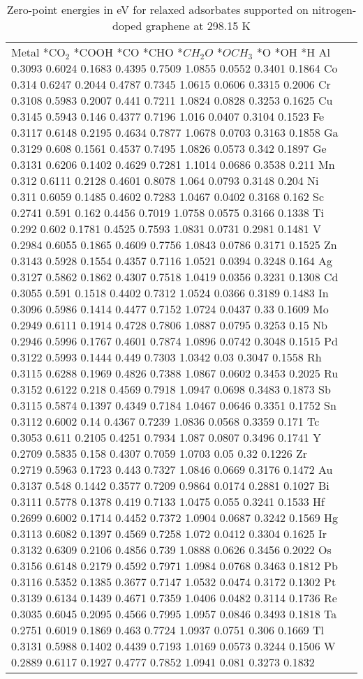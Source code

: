 \begin{table}[h]
    \centering
    \begin{tabular}{lr}
      \hline
      Metal	*CO$_2$	*COOH	*CO	*CHO	*$CH_2O$	*$OCH_3$	*O	*OH	*H
      \hline
      Al	0.3093	0.6024	0.1683	0.4395	0.7509	1.0855	0.0552	0.3401	0.1864
      Co	0.314	  0.6247	0.2044	0.4787	0.7345	1.0615	0.0606	0.3315	0.2006
      Cr	0.3108	0.5983	0.2007	0.441 	0.7211	1.0824	0.0828	0.3253	0.1625
      Cu	0.3145	0.5943	0.146	  0.4377	0.7196	1.016	  0.0407	0.3104	0.1523
      Fe	0.3117	0.6148	0.2195	0.4634	0.7877	1.0678	0.0703	0.3163	0.1858
      Ga	0.3129	0.608	  0.1561	0.4537	0.7495	1.0826	0.0573	0.342	  0.1897
      Ge	0.3131	0.6206	0.1402	0.4629	0.7281	1.1014	0.0686	0.3538	0.211
      Mn	0.312	  0.6111	0.2128	0.4601	0.8078	1.064 	0.0793	0.3148	0.204
      Ni	0.311	  0.6059	0.1485	0.4602	0.7283	1.0467	0.0402	0.3168	0.162
      Sc	0.2741	0.591 	0.162 	0.4456	0.7019	1.0758	0.0575	0.3166	0.1338
      Ti	0.292 	0.602 	0.1781	0.4525	0.7593	1.0831	0.0731	0.2981	0.1481
      V	  0.2984	0.6055	0.1865	0.4609	0.7756	1.0843	0.0786	0.3171	0.1525
      Zn	0.3143	0.5928	0.1554	0.4357	0.7116	1.0521	0.0394	0.3248	0.164
      Ag	0.3127	0.5862	0.1862	0.4307	0.7518	1.0419	0.0356	0.3231	0.1308
      Cd	0.3055	0.591 	0.1518	0.4402	0.7312	1.0524	0.0366	0.3189	0.1483
      In	0.3096	0.5986	0.1414	0.4477	0.7152	1.0724	0.0437	0.33	  0.1609
      Mo	0.2949	0.6111	0.1914	0.4728	0.7806	1.0887	0.0795	0.3253	0.15
      Nb	0.2946	0.5996	0.1767	0.4601	0.7874	1.0896	0.0742	0.3048	0.1515
      Pd	0.3122	0.5993	0.1444	0.449 	0.7303	1.0342	0.03	  0.3047	0.1558
      Rh	0.3115	0.6288	0.1969	0.4826	0.7388	1.0867	0.0602	0.3453	0.2025
      Ru	0.3152	0.6122	0.218	  0.4569	0.7918	1.0947	0.0698	0.3483	0.1873
      Sb	0.3115	0.5874	0.1397	0.4349	0.7184	1.0467	0.0646	0.3351	0.1752
      Sn	0.3112	0.6002	0.14	  0.4367	0.7239	1.0836	0.0568	0.3359	0.171
      Tc	0.3053	0.611 	0.2105	0.4251	0.7934	1.087	  0.0807	0.3496	0.1741
      Y	  0.2709	0.5835	0.158	  0.4307	0.7059	1.0703	0.05	  0.32	  0.1226
      Zr	0.2719	0.5963	0.1723	0.443	  0.7327	1.0846	0.0669	0.3176	0.1472
      Au	0.3137	0.548	  0.1442	0.3577	0.7209	0.9864	0.0174	0.2881	0.1027
      Bi	0.3111	0.5778	0.1378	0.419 	0.7133	1.0475	0.055 	0.3241	0.1533
      Hf	0.2699	0.6002	0.1714	0.4452	0.7372	1.0904	0.0687	0.3242	0.1569
      Hg	0.3113	0.6082	0.1397	0.4569	0.7258	1.072 	0.0412	0.3304	0.1625
      Ir	0.3132	0.6309	0.2106	0.4856	0.739 	1.0888	0.0626	0.3456	0.2022
      Os	0.3156	0.6148	0.2179	0.4592	0.7971	1.0984	0.0768	0.3463	0.1812
      Pb	0.3116	0.5352	0.1385	0.3677	0.7147	1.0532	0.0474	0.3172	0.1302
      Pt	0.3139	0.6134	0.1439	0.4671	0.7359	1.0406	0.0482	0.3114	0.1736
      Re	0.3035	0.6045	0.2095	0.4566	0.7995	1.0957	0.0846	0.3493	0.1818
      Ta	0.2751	0.6019	0.1869	0.463	  0.7724	1.0937	0.0751	0.306 	0.1669
      Tl	0.3131	0.5988	0.1402	0.4439	0.7193	1.0169	0.0573	0.3244	0.1506
      W	  0.2889	0.6117	0.1927	0.4777	0.7852	1.0941	0.081	  0.3273	0.1832
      \hline
    \end{tabular}
    \caption{Zero-point energies in eV for relaxed adsorbates supported on nitrogen-doped graphene at 298.15 K}
    \label{si_table9}
\end{table}


